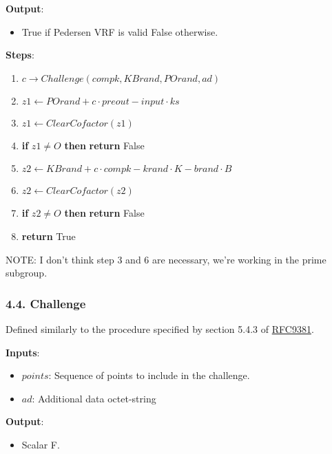 \documentclass[
]{article}
\providecommand{\tightlist}{%
  \setlength{\itemsep}{0pt}\setlength{\parskip}{0pt}}
\begin{document}
\textbf{Output}:

\begin{itemize}
\tightlist
\item
  True if Pedersen VRF is valid False otherwise.
\end{itemize}

\textbf{Steps}:

\begin{enumerate}
\def\labelenumi{\arabic{enumi}.}
\tightlist
\item
  \(c \rightarrow Challenge(compk, KBrand, POrand, ad)\)
\item
  \(z1 \leftarrow POrand + c \cdot preout - input \cdot ks\)
\item
  \(z1 \leftarrow ClearCofactor(z1)\)
\item
  \textbf{if} \(z1 \neq O\) \textbf{then} \textbf{return} False
\item
  \(z2 \leftarrow KBrand + c \cdot compk - krand \cdot K - brand \cdot B\)
\item
  \(z2 \leftarrow ClearCofactor(z2)\)
\item
  \textbf{if} \(z2 \neq O\) \textbf{then} \textbf{return} False
\item
  \textbf{return} True
\end{enumerate}

NOTE: I don't think step 3 and 6 are necessary, we're working in the
prime subgroup.

\hypertarget{challenge}{%
\subsubsection{4.4. Challenge}\label{challenge}}

Defined similarly to the procedure specified by section 5.4.3 of
\href{https://datatracker.ietf.org/doc/rfc9381/}{RFC9381}.

\textbf{Inputs}:

\begin{itemize}
\tightlist
\item
  \(points\): Sequence of points to include in the challenge.
\item
  \(ad\): Additional data octet-string
\end{itemize}

\textbf{Output}:

\begin{itemize}
\tightlist
\item
  Scalar \in F.
\end{itemize}
\end{document}
